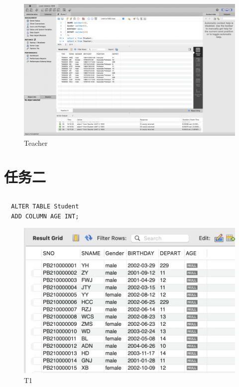 \documentclass[UTF8]{ctexart}
\begin{document}
\begin{figure}[H]
  \centering
  \includegraphics[scale=0.1]{pics/Teacher.png}
  \caption*{Teacher}
\end{figure}

\section{任务二}

\subsection{}
\begin{lstlisting}
  ALTER TABLE Student
  ADD COLUMN AGE INT;
\end{lstlisting}
\begin{figure}[H]
  \centering
  \includegraphics[scale=0.4]{pics/1.png}
  \caption*{T1}
\end{figure}
\end{document}
